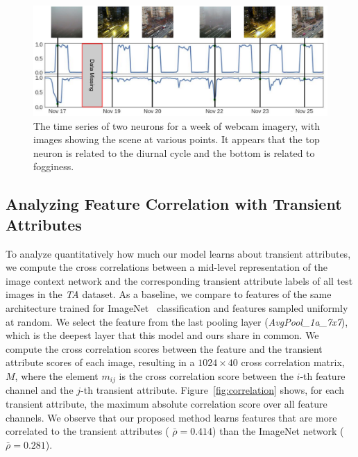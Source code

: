 \documentclass{bmvc2k}
\newcommand{\figref}[1]{Figure~\ref{fig:#1}}
\begin{document}
\begin{figure}
  \centering
  
  \includegraphics[width=.98\textwidth]{timeline/timeline}
  
  \caption{The time series of two neurons for a week of webcam
  imagery, with images showing the scene at various points. It appears
  that the top neuron is related to the diurnal cycle and the bottom
  is related to fogginess.}
  
  \label{fig:signal}
\end{figure}

\subsection{Analyzing Feature Correlation with Transient Attributes}

To analyze quantitatively how much our model learns about transient
attributes, we compute the cross correlations between a mid-level
representation of the image context network and the corresponding
transient attribute labels of all test images in the {\em TA} dataset.
As a baseline, we compare to features of the same architecture trained
for ImageNet~\cite{inception15} classification and features sampled
uniformly at random.  We select the feature
from the last pooling layer ({\em AvgPool\_1a\_7x7}), which is the
deepest layer that this model and ours share in common.
%
We compute the cross correlation scores between the feature and the
transient attribute scores of each image, resulting in a $1024 \times
40$ cross correlation matrix, $M$, where the element $m_{ij}$ is the
cross correlation score between the $i$-th feature channel and the
$j$-th transient attribute.
%
\figref{correlation} shows, for each
transient attribute, the maximum absolute correlation score
over all feature channels. We observe that our proposed method learns
features that are more correlated to the transient attributes (
$\bar{\rho} = 0.414$) than the ImageNet network ($\bar{\rho} =
0.281$).
\end{document}
